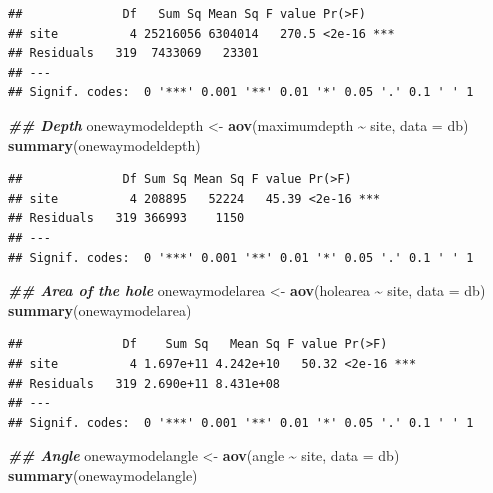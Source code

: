 \documentclass[
]{article}
\newenvironment{Shaded}{\begin{snugshade}}{\end{snugshade}}
\newcommand{\AttributeTok}[1]{\textcolor[rgb]{0.13,0.29,0.53}{#1}}
\newcommand{\DocumentationTok}[1]{\textcolor[rgb]{0.56,0.35,0.01}{\textbf{\textit{#1}}}}
\newcommand{\FunctionTok}[1]{\textcolor[rgb]{0.13,0.29,0.53}{\textbf{#1}}}
\newcommand{\NormalTok}[1]{#1}
\newcommand{\OtherTok}[1]{\textcolor[rgb]{0.56,0.35,0.01}{#1}}
\newcommand{\SpecialCharTok}[1]{\textcolor[rgb]{0.81,0.36,0.00}{\textbf{#1}}}
\begin{document}
\begin{verbatim}
##              Df   Sum Sq Mean Sq F value Pr(>F)    
## site          4 25216056 6304014   270.5 <2e-16 ***
## Residuals   319  7433069   23301                   
## ---
## Signif. codes:  0 '***' 0.001 '**' 0.01 '*' 0.05 '.' 0.1 ' ' 1
\end{verbatim}

\begin{Shaded}
\begin{Highlighting}[]
\DocumentationTok{\#\# Depth}
\NormalTok{onewaymodeldepth }\OtherTok{\textless{}{-}} \FunctionTok{aov}\NormalTok{(maximumdepth }\SpecialCharTok{\textasciitilde{}}\NormalTok{ site, }\AttributeTok{data =}\NormalTok{ db)}
\FunctionTok{summary}\NormalTok{(onewaymodeldepth)}
\end{Highlighting}
\end{Shaded}

\begin{verbatim}
##              Df Sum Sq Mean Sq F value Pr(>F)    
## site          4 208895   52224   45.39 <2e-16 ***
## Residuals   319 366993    1150                   
## ---
## Signif. codes:  0 '***' 0.001 '**' 0.01 '*' 0.05 '.' 0.1 ' ' 1
\end{verbatim}

\begin{Shaded}
\begin{Highlighting}[]
\DocumentationTok{\#\# Area of the hole}
\NormalTok{onewaymodelarea }\OtherTok{\textless{}{-}} \FunctionTok{aov}\NormalTok{(holearea }\SpecialCharTok{\textasciitilde{}}\NormalTok{ site, }\AttributeTok{data =}\NormalTok{ db)}
\FunctionTok{summary}\NormalTok{(onewaymodelarea)}
\end{Highlighting}
\end{Shaded}

\begin{verbatim}
##              Df    Sum Sq   Mean Sq F value Pr(>F)    
## site          4 1.697e+11 4.242e+10   50.32 <2e-16 ***
## Residuals   319 2.690e+11 8.431e+08                   
## ---
## Signif. codes:  0 '***' 0.001 '**' 0.01 '*' 0.05 '.' 0.1 ' ' 1
\end{verbatim}

\begin{Shaded}
\begin{Highlighting}[]
\DocumentationTok{\#\# Angle}
\NormalTok{onewaymodelangle }\OtherTok{\textless{}{-}} \FunctionTok{aov}\NormalTok{(angle }\SpecialCharTok{\textasciitilde{}}\NormalTok{ site, }\AttributeTok{data =}\NormalTok{ db)}
\FunctionTok{summary}\NormalTok{(onewaymodelangle)}
\end{Highlighting}
\end{Shaded}
\end{document}
